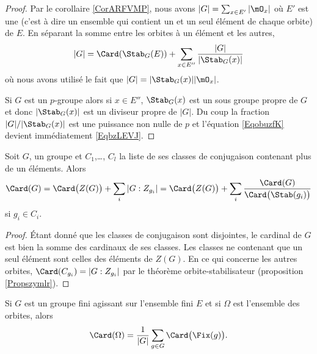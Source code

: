 \begin{proof}
    Par le corollaire \ref{CorARFVMP}, nous avons \( | G |=\sum_{x\in E'}| \mO_x |\) où \( E'\) est une  (c'est à dire un ensemble qui contient un et un seul élément de chaque orbite) de \( E\). En séparant la somme entre les orbites à un élément et les autres,
    \begin{equation}    \label{EqeggkBs}
        | G |=\Card(\Stab_G(E))+\sum_{x\in E''}\frac{ | G | }{ | \Stab_G(x) | }
    \end{equation}  \label{EqDgYbhm}
    où nous avons utilisé le fait que \( | G |=| \Stab_G(x) | |\mO_x |\).

    Si \( G\) est un \( p\)-groupe alors si \( x\in E''\), \( \Stab_G(x)\) est un sous groupe propre de \( G\) et donc \( | \Stab_G(x) |\) est un diviseur propre de \( | G |\). Du coup la fraction \( | G |/|\Stab_G(x)|\) est une puissance non nulle de \( p\) et l'équation \eqref{EqobuzfK} devient immédiatement \eqref{EqbzLEVJ}.
\end{proof}
 

\begin{corollary}
    Soit \( G\), un groupe et \( C_1\),\ldots, \( C_l\) la liste de ses classes de conjugaison contenant plus de un éléments. Alors
    \begin{equation}        \label{EqkgGmoq}
        \Card(G)=\Card\big( Z(G) \big)+\sum_i| G:Z_{g_i} |=\Card\big( Z(G) \big)+\sum_i\frac{ \Card(G) }{ \Card\big( \Stab(g_i) \big) }
    \end{equation}
    si \( g_i\in C_i\).
\end{corollary}

\begin{proof}
    Étant donné que les classes de conjugaison sont disjointes, le cardinal de \( G\) est bien la somme des cardinaux de ses classes. Les classes ne contenant que un seul élément sont celles des éléments de \( Z(G)\). En ce qui concerne les autres orbites, \( \Card(C_{g_i})=| G:Z_{g_i} |\) par le théorème orbite-stabilisateur (proposition \ref{Propszymlr}).
\end{proof}

\begin{theorem}  
    Si \( G\) est un groupe fini agissant sur l'ensemble fini \( E\) et si \( \Omega\) est l'ensemble des orbites, alors
    \begin{equation}    \label{EqTUsblv}
        \Card(\Omega)=\frac{1}{ | G | }\sum_{g\in G}\Card\big( \Fix(g) \big).
    \end{equation}
\end{theorem}


